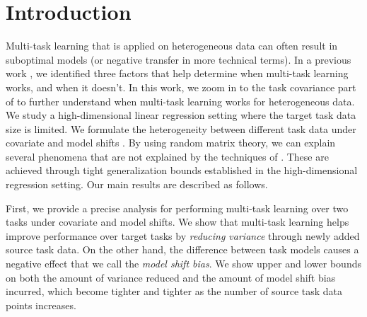 \section{Introduction}

Multi-task learning that is applied on heterogeneous data can often result in suboptimal models (or negative transfer in more technical terms).
In a previous work \cite{WZR20}, we identified three factors that help determine when multi-task learning works, and when it doesn't.
In this work, we zoom in to the task covariance part of \cite{WZR20} to further understand when multi-task learning works for heterogeneous data.
We study a high-dimensional linear regression setting where the target task data size is limited.
We formulate the heterogeneity between different task data under covariate and model shifts \cite{PY09,K18}.
By using random matrix theory, we can explain several phenomena that are not explained by the techniques of \cite{WZR20}.
These are achieved through tight generalization bounds established in the high-dimensional regression setting.
Our main results are described as follows.

\smallskip
{}
	First, we provide a precise analysis for performing multi-task learning over two tasks under covariate and model shifts.
	We show that multi-task learning helps improve performance over target tasks by \textit{reducing variance} through newly added source task data.
	On the other hand, the difference between task models causes a negative effect that we call the \textit{model shift bias}.
	We show upper and lower bounds on both the amount of variance reduced and the amount of model shift bias incurred, which become tighter and tighter as the number of source task data points increases.

